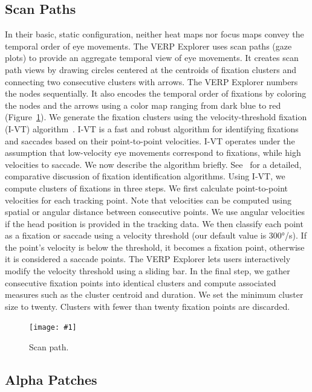 \documentclass{sigchi}
\newcommand{\insertpicture}[2]{\begin{center}\texttt{[image: \#1]}\end{center}}
\begin{document}
\pagebreak

\subsection{Scan Paths} In their basic, static configuration, neither heat
maps nor focus maps convey the temporal order of eye movements.  The VERP
Explorer uses scan paths (gaze plots) to provide an aggregate temporal view
of eye movements. It creates scan path views by drawing circles centered at
the centroids of fixation clusters and connecting two consecutive clusters
with arrows. The VERP Explorer numbers the nodes sequentially. It also
encodes the temporal order of fixations by coloring the nodes and the
arrows using a color map ranging from dark blue to red~\cite{Harrower_2003}
(Figure~\ref{fig:scanpath}).  We generate the fixation clusters using the velocity-threshold
fixation (I-VT) algorithm~\cite{Salvucci_2000}.  I-VT is a fast and robust
algorithm for identifying fixations and saccades based on their
point-to-point velocities.  I-VT operates under the assumption that
low-velocity eye movements correspond to fixations, while high velocities
to saccade. We now describe the algorithm briefly. See~\cite{Salvucci_2000}
for a detailed, comparative discussion of fixation identification
algorithms. Using I-VT, we compute clusters of fixations in three steps. We
first calculate point-to-point velocities for each tracking point.  Note
that velocities can be computed using spatial or angular distance between
consecutive points.  We use angular velocities if the head position is
provided in the tracking data. We then classify each point as a fixation or
saccade using a velocity threshold (our default value is 300°/s).  If the
point’s velocity is below the threshold, it becomes a fixation point,
otherwise it is considered a saccade points. The VERP Explorer lets users
interactively modify the velocity threshold using a sliding bar. In the
final step, we gather consecutive fixation points into identical clusters
and compute associated measures such as the cluster centroid and duration.
We set the minimum cluster size to twenty. Clusters with fewer than twenty
fixation points are discarded. 

\begin{figure}
\insertpicture{figures/scanpath.pdf}{0.5}
\caption{Scan path.\label{fig:scanpath}}
\end{figure}	

\subsection{Alpha Patches}
\end{document}
